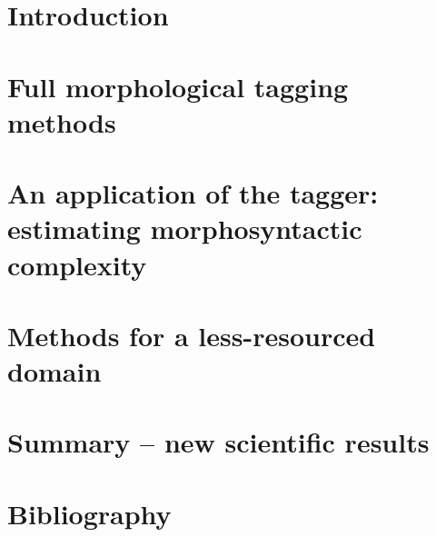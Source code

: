 \documentclass[a4paper,11pt,oneside,times,numbered,custommargin,custombib,PageStyleII]{Classes/PhDThesisPSnPDF}
\begin{document}
\chapter{Introduction}



\chapter{Full morphological tagging methods}


\chapter{An application of the tagger: estimating morphosyntactic complexity}


\chapter{Methods for a less-resourced domain}


\chapter{Summary -- new scientific results}


\chapter*{Bibliography}



\end{document}
